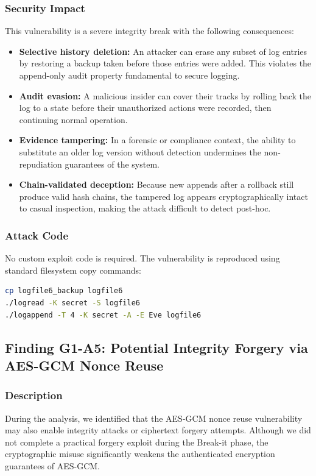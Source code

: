 \documentclass[a4paper, 12pt]{article}
\begin{document}
    \subsubsection{Security Impact}
    This vulnerability is a severe integrity break with the following consequences:
    \begin{itemize}
        \item \textbf{Selective history deletion:} An attacker can erase any subset of log entries by restoring a backup taken before those entries were added. This violates the append-only audit property fundamental to secure logging.
        \item \textbf{Audit evasion:} A malicious insider can cover their tracks by rolling back the log to a state before their unauthorized actions were recorded, then continuing normal operation.
        \item \textbf{Evidence tampering:} In a forensic or compliance context, the ability to substitute an older log version without detection undermines the non-repudiation guarantees of the system.
        \item \textbf{Chain-validated deception:} Because new appends after a rollback still produce valid hash chains, the tampered log appears cryptographically intact to casual inspection, making the attack difficult to detect post-hoc.
    \end{itemize}

    \subsubsection{Attack Code}
    No custom exploit code is required. The vulnerability is reproduced using standard filesystem copy commands:
    \begin{lstlisting}[language=bash]
cp logfile6_backup logfile6
./logread -K secret -S logfile6
./logappend -T 4 -K secret -A -E Eve logfile6
    \end{lstlisting}

    \subsection{Finding G1-A5: Potential Integrity Forgery via AES-GCM Nonce Reuse}
    \subsubsection{Description}
    During the analysis, we identified that the AES-GCM nonce reuse vulnerability may also enable integrity attacks or ciphertext forgery attempts. Although we did not complete a practical forgery exploit during the Break-it phase, the cryptographic misuse significantly weakens the authenticated encryption guarantees of AES-GCM.
\end{document}
